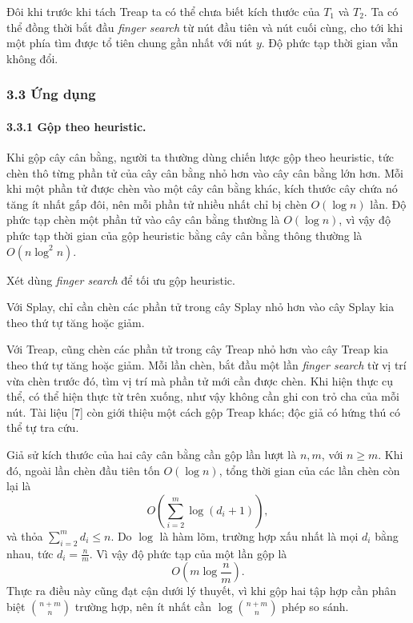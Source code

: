 \documentclass[11pt]{article}
\begin{document}
Đôi khi trước khi tách Treap ta có thể chưa biết kích thước của \(T_1\) và
\(T_2\). Ta có thể đồng thời bắt đầu \emph{finger search} từ nút đầu tiên và
nút cuối cùng, cho tới khi một phía tìm được tổ tiên chung gần nhất với nút
\(y\). Độ phức tạp thời gian vẫn không đổi.

\subsubsection*{3.3 Ứng dụng}

\paragraph{3.3.1 Gộp theo heuristic.}
Khi gộp cây cân bằng, người ta thường dùng chiến lược gộp theo heuristic, tức
chèn thô từng phần tử của cây cân bằng nhỏ hơn vào cây cân bằng lớn hơn. Mỗi
khi một phần tử được chèn vào một cây cân bằng khác, kích thước cây chứa nó
tăng ít nhất gấp đôi, nên mỗi phần tử nhiều nhất chỉ bị chèn \(O(\log n)\) lần.
Độ phức tạp chèn một phần tử vào cây cân bằng thường là \(O(\log n)\), vì vậy
độ phức tạp thời gian của gộp heuristic bằng cây cân bằng thông thường là
\(O(n\log^2 n)\).

Xét dùng \emph{finger search} để tối ưu gộp heuristic.

Với Splay, chỉ cần chèn các phần tử trong cây Splay nhỏ hơn vào cây Splay kia
theo thứ tự tăng hoặc giảm.

Với Treap, cũng chèn các phần tử trong cây Treap nhỏ hơn vào cây Treap kia theo
thứ tự tăng hoặc giảm. Mỗi lần chèn, bắt đầu một lần \emph{finger search} từ vị
trí vừa chèn trước đó, tìm vị trí mà phần tử mới cần được chèn. Khi hiện thực
cụ thể, có thể hiện thực từ trên xuống, như vậy không cần ghi con trỏ cha của
mỗi nút. Tài liệu [7] còn giới thiệu một cách gộp Treap khác; độc giả có hứng
thú có thể tự tra cứu.

Giả sử kích thước của hai cây cân bằng cần gộp lần lượt là \(n,m\), với
\(n\ge m\). Khi đó, ngoài lần chèn đầu tiên tốn \(O(\log n)\), tổng thời gian
của các lần chèn còn lại là
\[
  O\left(\sum_{i=2}^{m}\log(d_i+1)\right),
\]
và thỏa \(\sum_{i=2}^{m}d_i\le n\). Do \(\log\) là hàm lõm, trường hợp xấu
nhất là mọi \(d_i\) bằng nhau, tức \(d_i=\frac{n}{m}\). Vì vậy độ phức tạp của
một lần gộp là
\[
  O\left(m\log\frac{n}{m}\right).
\]
Thực ra điều này cũng đạt cận dưới lý thuyết, vì khi gộp hai tập hợp cần phân
biệt \(\binom{n+m}{n}\) trường hợp, nên ít nhất cần
\(\log\binom{n+m}{n}\) phép so sánh.
\end{document}
